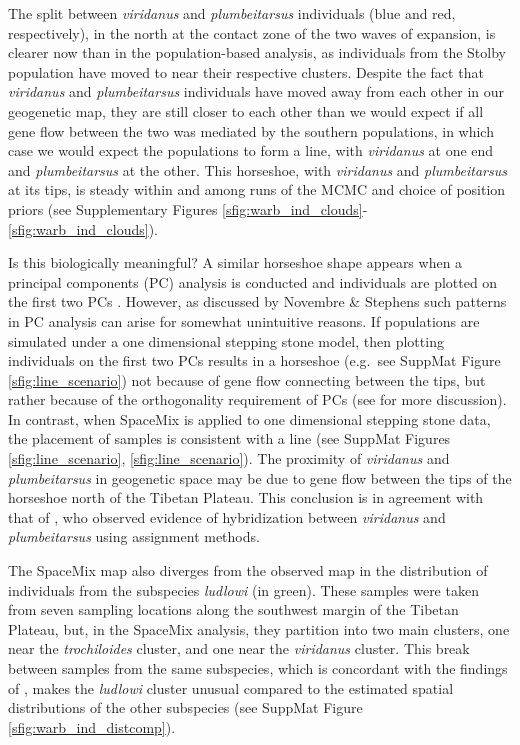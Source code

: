 \documentclass[12pt]{article}
\begin{document}
The split between \textit{viridanus} and \textit{plumbeitarsus} individuals (blue and red, respectively), in the north at the contact zone of the two waves of expansion, is clearer now than in the population-based analysis, as individuals from the Stolby population have moved to near their respective clusters. 
Despite the fact that \textit{viridanus} and \textit{plumbeitarsus} individuals have moved away from each other in our geogenetic map, 
they are still closer to each other than we would expect if all gene flow between the two was mediated by the southern populations,
in which case we would expect the populations to form a line, 
with \textit{viridanus} at one end and \textit{plumbeitarsus} at the other. 
This horseshoe, with \textit{viridanus} and \textit{plumbeitarsus} at its tips, is steady within and among runs of the MCMC and choice of position priors (see Supplementary Figures \ref{sfig:warb_ind_clouds}-\ref{sfig:warb_ind_clouds}).  

Is this biologically meaningful?  A similar horseshoe shape appears when a principal components (PC) analysis is conducted and individuals are plotted on the first two PCs \citep[see SuppMat Figure \ref{sfig:warb_ind_PC_map} and ][]{alcaide2014genomic}.  
However, as discussed by Novembre \& Stephens \citep{novembre_interpreting_2008} such patterns in PC analysis can arise for somewhat unintuitive reasons. If populations are simulated under a one dimensional stepping stone model, then plotting individuals on the first two PCs results in a horseshoe (e.g.\ see SuppMat Figure \ref{sfig:line_scenario}) not because of gene flow connecting between the tips, but rather because of the orthogonality requirement of PCs (see \cite{novembre_interpreting_2008} for more discussion).  In contrast, when SpaceMix is applied to one dimensional stepping stone data, the placement of samples is consistent with a line (see SuppMat Figures \ref{sfig:line_scenario}, \ref{sfig:line_scenario}). The proximity of \textit{viridanus} and \textit{plumbeitarsus} in geogenetic space may be due to gene flow between the tips of the horseshoe north of the Tibetan Plateau. This conclusion is in agreement with that of \citet{alcaide2014genomic}, who observed evidence of hybridization between \textit{viridanus} and \textit{plumbeitarsus} using assignment methods.

The SpaceMix map also diverges from the observed map in the distribution of individuals from the subspecies \textit{ludlowi} (in green).  These samples were taken from seven sampling locations along the southwest margin of the Tibetan Plateau, but, in the SpaceMix analysis, they partition into two main clusters, one near the \textit{trochiloides} cluster, and one near the \textit{viridanus} cluster.  This break between samples from the same subspecies, which is concordant with the findings of \citet{alcaide2014genomic}, makes the \textit{ludlowi} cluster unusual compared to the estimated spatial distributions of the other subspecies (see SuppMat Figure \ref{sfig:warb_ind_distcomp}).
\end{document}

